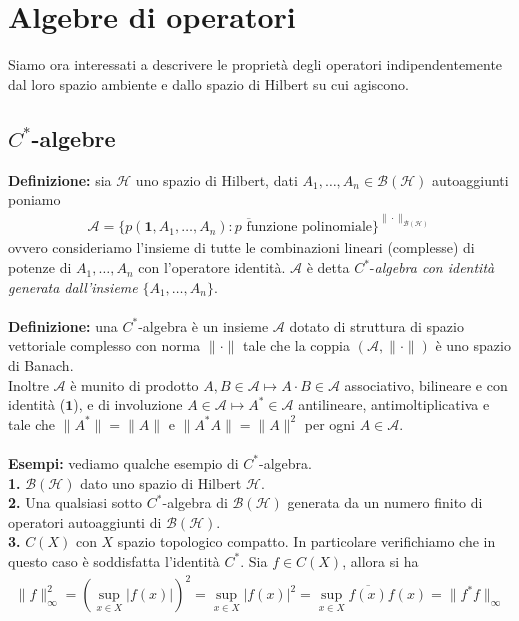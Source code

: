 \documentclass{article}
\numberwithin{equation}{subsection}
\begin{document}
\newpage
\section{Algebre di operatori}
Siamo ora interessati a descrivere le proprietà degli operatori indipendentemente dal loro spazio ambiente e dallo spazio di Hilbert su cui agiscono.
\subsection{$C^*$-algebre}
\textbf{Definizione:} sia $\mathcal{H}$ uno spazio di Hilbert, dati $A_1, \dots, A_n \in \mathcal{B}(\mathcal{H})$ autoaggiunti poniamo 
\begin{align*}
    \mathscr{A} = \overline{\{p(\mathbf{1}, A_1, \dots, A_n) : p \text{ funzione polinomiale}\}}^{\|\cdot\|_{\mathcal{B}(\mathcal{H})}}
\end{align*}
ovvero consideriamo l'insieme di tutte le combinazioni lineari (complesse) di potenze di $A_1, \dots, A_n$ con l'operatore identità. $\mathscr{A}$ è detta $C^*$-\textit{algebra con identità generata dall'insieme} $\{A_1, \dots, A_n\}$. \\ \\
\textbf{Definizione:} una $C^*$-algebra è un insieme $\mathscr{A}$ dotato di struttura di spazio vettoriale complesso con norma $\|\cdot\|$ tale che la coppia $(\mathscr{A}, \|\cdot\|)$ è uno spazio di Banach. \\
Inoltre $\mathscr{A}$ è munito di prodotto $A, B \in \mathscr{A} \mapsto A \cdot B \in \mathscr{A}$ associativo, bilineare e con identità ($\mathbf{1}$), e di involuzione $A \in \mathscr{A} \mapsto A^* \in \mathscr{A}$ antilineare, antimoltiplicativa e tale che $\|A^*\| = \|A\|$ e $\|A^*A\| = \|A\|^2$ per ogni $A \in \mathscr{A}$. \\ \\
\textbf{Esempi:} vediamo qualche esempio di $C^*$-algebra. \\
\textbf{1.} $\mathcal{B}(\mathcal{H})$ dato uno spazio di Hilbert $\mathcal{H}$. \\
\textbf{2.} Una qualsiasi sotto $C^*$-algebra di $\mathcal{B}(\mathcal{H})$ generata da un numero finito di operatori autoaggiunti di $\mathcal{B}(\mathcal{H})$. \\
\textbf{3.} $C(X)$ con $X$ spazio topologico compatto. In particolare verifichiamo che in questo caso è soddisfatta l'identità $C^*$. Sia $f \in C(X)$, allora si ha 
\begin{align*}
    \|f\|^2_\infty = \left(\sup_{x \in X}|f(x)|\right)^2 = \sup_{x \in X}|f(x)|^2 = \sup_{x \in X}\overline{f(x)}f(x) = \|f^*f\|_\infty 
\end{align*}
\end{document}

